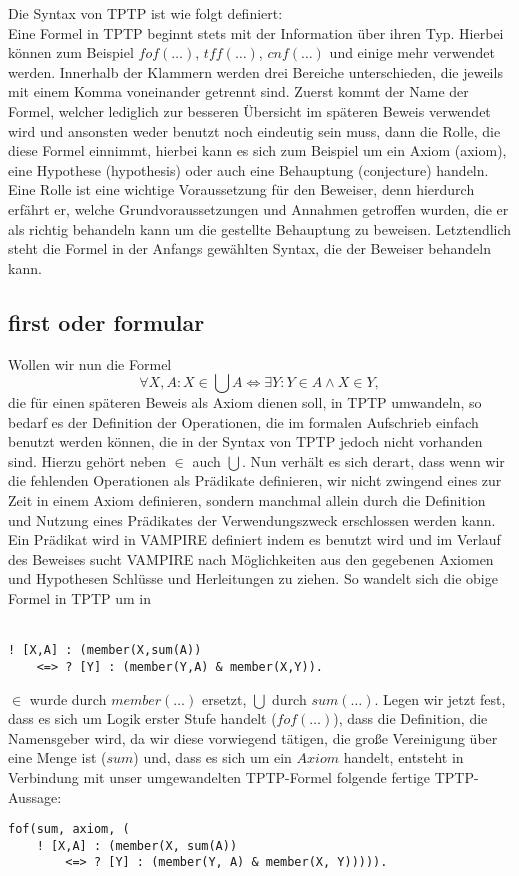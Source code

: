 \documentclass{article}
\begin{document}
Die Syntax von TPTP ist wie folgt definiert:\\
Eine Formel in TPTP beginnt stets mit der Information über ihren Typ. Hierbei können zum Beispiel $fof(\dots)$, $tff(\dots)$, $cnf(\dots)$ und einige mehr verwendet werden.
Innerhalb der Klammern werden drei Bereiche unterschieden, die jeweils mit einem Komma voneinander getrennt sind. 
Zuerst kommt der Name der Formel, welcher lediglich zur besseren Übersicht im späteren Beweis verwendet wird und ansonsten weder benutzt noch eindeutig sein muss,
dann die Rolle, die diese Formel einnimmt, hierbei kann es sich zum Beispiel um ein Axiom (axiom), eine Hypothese (hypothesis) oder auch eine Behauptung (conjecture) handeln.
Eine Rolle ist eine wichtige Voraussetzung für den Beweiser, denn hierdurch erfährt er, welche Grundvoraussetzungen und Annahmen getroffen wurden, die er als richtig behandeln kann um die gestellte Behauptung zu beweisen.
Letztendlich steht die Formel in der Anfangs gewählten Syntax, die der Beweiser behandeln kann.



\subsection{first oder formular}
\label{subsec:tptpfof}
Wollen wir nun die Formel 
\[\forall X,A : X \in \bigcup A \Leftrightarrow \exists Y : Y \in A \land X \in Y,\]
die für einen späteren Beweis als Axiom dienen soll, in TPTP umwandeln, 
so bedarf es der Definition der Operationen, die im formalen Aufschrieb einfach benutzt werden können, 
die in der Syntax von TPTP jedoch nicht vorhanden sind.
Hierzu gehört neben $\in$ auch  $\bigcup$. 
Nun verhält es sich derart, dass wenn wir die fehlenden Operationen als Prädikate definieren, 
wir nicht zwingend eines zur Zeit in einem Axiom definieren, sondern manchmal allein durch die Definition und Nutzung eines Prädikates der Verwendungszweck erschlossen werden kann.
Ein Prädikat wird in VAMPIRE definiert indem es benutzt wird und im Verlauf des Beweises sucht VAMPIRE nach Möglichkeiten aus den gegebenen Axiomen und Hypothesen Schlüsse und Herleitungen zu ziehen.
So wandelt sich die obige Formel in TPTP um in \\ \\
\begin{lstlisting}[language=tptp]
! [X,A] : (member(X,sum(A)) 
	<=> ? [Y] : (member(Y,A) & member(X,Y)).
\end{lstlisting}
$\in$ wurde durch $member(\dots)$ ersetzt, $\bigcup$ durch $sum(\dots)$.
Legen wir jetzt fest, dass es sich um Logik erster Stufe handelt ($fof(\dots)$), dass die Definition, die Namensgeber wird, da wir diese vorwiegend tätigen, die große Vereinigung über eine Menge ist ($sum$) und, dass es sich um ein $Axiom$ handelt,
entsteht in Verbindung mit unser umgewandelten TPTP-Formel folgende fertige TPTP-Aussage:
\begin{lstlisting}[language=tptp]
fof(sum, axiom, (	
	! [X,A] : (member(X, sum(A)) 
		<=> ? [Y] : (member(Y, A) & member(X, Y))))).
\end{lstlisting}
\end{document}
